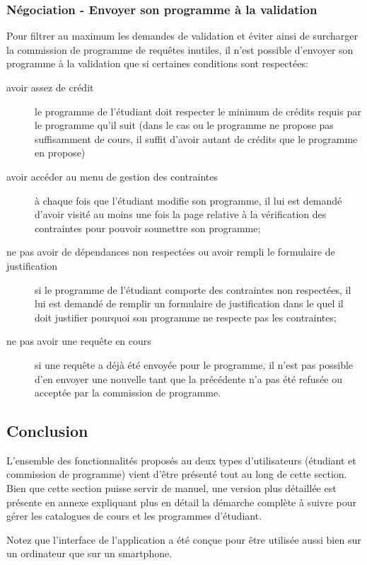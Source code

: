 \subsubsection{Négociation - Envoyer son programme à la validation}
 \label{validation_request}
Pour filtrer au maximum les demandes de validation et éviter ainsi de surcharger la commission de programme de requêtes inutiles, il n'est possible d'envoyer son programme à la validation que si certaines conditions sont respectées:
\begin{description}
  \item[avoir assez de crédit] le programme de l'étudiant doit respecter le minimum de crédits requis par le programme qu'il suit (dans le cas ou le programme ne propose pas suffisamment de cours, il suffit d'avoir autant de crédits que le programme en propose)
  \item[avoir accéder au menu de gestion des contraintes] à chaque fois que l'étudiant modifie son programme, il lui est demandé d'avoir visité au moins une fois la page relative à la vérification des contraintes pour pouvoir soumettre son programme;
  \item[ne pas avoir de dépendances non respectées ou avoir rempli le formulaire de justification] si le programme de l'étudiant comporte des contraintes non respectées, il lui est demandé de remplir un formulaire de justification dans le quel il doit justifier pourquoi son programme ne respecte pas les contraintes;
  \item[ne pas avoir une requête en cours] si une requête a déjà été envoyée pour le programme, il n'est pas possible d'en envoyer une nouvelle tant que la précédente n'a pas été refusée ou acceptée par la commission de programme.
\end{description} 

\subsection{Conclusion}
L'ensemble des fonctionnalités proposés au deux types d'utilisateurs (étudiant et commission de programme) vient d'être présenté tout au long de cette section. Bien que cette section puisse servir de manuel, une version plus détaillée est présente en annexe expliquant plus en détail la démarche complète à suivre pour gérer les catalogues de cours et les programmes d'étudiant.

Notez que l'interface de l'application a été conçue pour être utilisée aussi bien sur un ordinateur que sur un smartphone. 


